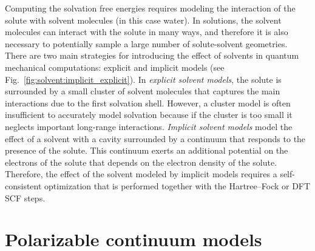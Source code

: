\documentclass[../Main/chem371-notes.tex]{subfiles}
\begin{document}
Computing the solvation free energies requires modeling the interaction of the solute with solvent molecules (in this case water).
In solutions, the solvent molecules can interact with the solute in many ways, and therefore it is also necessary to potentially sample a large number of solute-solvent geometries.
There are two main strategies for introducing the effect of solvents in quantum mechanical computations: explicit and implicit models (see Fig.~\ref{fig:solvent:implicit_explicit}).
In \emph{explicit solvent models}, the solute is surrounded by a small cluster of solvent molecules that captures the main interactions due to the first solvation shell.
However, a cluster model is often insufficient to accurately model solvation because if the cluster is too small it neglects important long-range interactions.
\emph{Implicit solvent models} model the effect of a solvent with a cavity surrounded by a continuum that responds to the presence of the solute. This continuum exerts an additional potential on the electrons of the solute that depends on the electron density of the solute.
Therefore, the effect of the solvent modeled by implicit models requires a self-consistent optimization that is performed together with the Hartree--Fock or DFT SCF steps.

\section{Polarizable continuum models}

\end{document}
